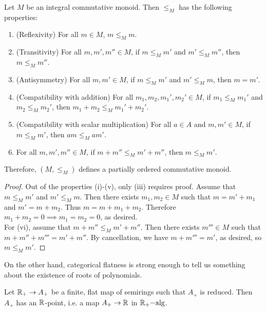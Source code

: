 \begin{proposition}\label{prop:poset}
Let $M$ be an integral commutative monoid. Then $\le_M$ has the following properties:
\begin{enumerate}
\item[(i)] (Reflexivity) For all $m \in M$, $m \le_M m$.
\item[(ii)] (Transitivity) For all $m,m',m'' \in M$, if $m \le_M m'$ and $m' \le_M m''$, then $m \le_M m''$.
\item[(iii)] (Antisymmetry) For all $m,m' \in M$, if $m \le_M m'$ and $m' \le_M m$, then $m=m'$.
\item[(iv)] (Compatibility with addition) For all $m_1,m_2,m_1',m_2' \in M$, if $m_1 \le_M m_1'$ and $m_2 \le_M m_2'$, 
then $m_1 + m_2 \le_M m_1' + m_2'$.
\item[(v)] (Compatibility with scalar multiplication) For all $a \in A$ and $m,m' \in M$, if $m \le_M m'$, then $a m \le_M a m'$.
\item[(vi)] For all $m,m',m'' \in M$, if $m + m'' \le_M m' + m''$, then $m \le_M m'$.
\end{enumerate}
Therefore, $(M, \le_M)$ defines a partially ordered commutative monoid.
\end{proposition}
\begin{proof}
Out of the properties (i)-(v), only (iii) requires proof. Assume that $m \le_M m'$ and $m' \le_M m$. 
Then there exists $m_1,m_2 \in M$ such that $m= m' + m_1$ and $m' = m + m_2$. Thus $m=m+m_1+m_2$. 
Therefore $m_1+m_2=0 \implies m_1=m_2=0$, as desired.\\
\indent For (vi), assume that $m + m'' \le_M m' + m''$. Then there exists $m''' \in M$ such that $m + m'' + m''' = m' + m''$. 
By cancellation, we have $m + m''' = m'$, as desired, so $m \le_M m'$.
\end{proof}
On the other hand, categorical flatness is strong enough to tell us something about the existence of roots of polynomials.
\begin{proposition}
Let $\mathbb{R}_{+} \rightarrow A_{+}$ be a finite, flat map of semirings such that $A_+$ is reduced. Then $A_+$ has an $\mathbb{R}$-point, i.e. 
a map $A_{+} \rightarrow \mathbb{R}$ in ${\mathbb{R}_{+}}\mathrm{-alg}$. 
\end{proposition}

